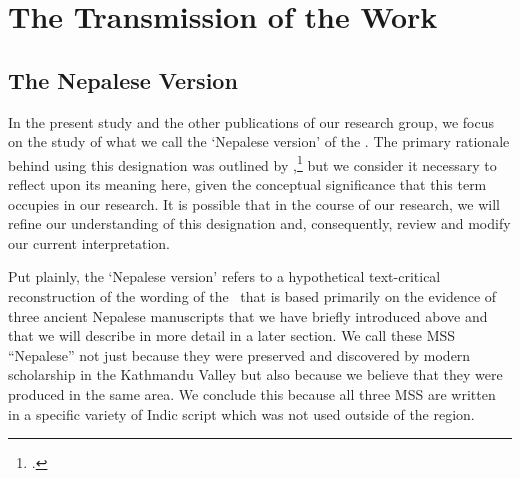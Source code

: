 \chapter{The Transmission of the Work}
\label{transmission}
\section{The Nepalese Version}

In the present study and the other publications of our research group, we focus
on the study of what we call the `Nepalese version' of the \SS. The primary
rationale behind using this designation was outlined by
\citeauthor{kleb-2021b},\footcite[2--3]{kleb-2021b} but we consider it necessary
to reflect upon its meaning here, given the conceptual significance that this term
occupies in our research. %
It is possible that in the course of our research, we will refine our
understanding of this designation and, consequently, review and modify our current
interpretation.%

Put plainly, the `Nepalese version' refers to a hypothetical text-critical
reconstruction of the wording of the \SS\ that is based primarily on the evidence
of three ancient Nepalese manuscripts that we have briefly introduced above and
that we will describe in more detail in a later section.  We call these MSS
“Nepalese” not just because they were preserved and discovered by modern
scholarship in the Kathmandu Valley but also because we believe that they were
produced in the same area. We conclude this because all three MSS are written in a
specific variety of Indic script which was not used outside of the region.

